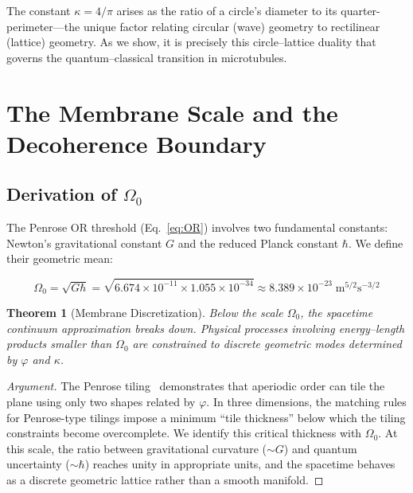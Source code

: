 \documentclass[12pt,a4paper]{article}
\theoremstyle{plain}
\newtheorem{theorem}{Theorem}[section]
\theoremstyle{definition}
\newcommand{\OmegaZero}{\Omega_0}
\newcommand{\golden}{\varphi}
\newcommand{\kap}{\kappa}
\begin{document}
The constant $\kap = 4/\pi$ arises as the ratio of a circle's diameter to its quarter-perimeter---the unique factor relating circular (wave) geometry to rectilinear (lattice) geometry. As we show, it is precisely this circle--lattice duality that governs the quantum--classical transition in microtubules.

\section{The Membrane Scale and the Decoherence Boundary}
\label{sec:membrane}

\subsection{Derivation of $\OmegaZero$}

The Penrose OR threshold (Eq.~\ref{eq:OR}) involves two fundamental constants: Newton's gravitational constant $G$ and the reduced Planck constant $\hbar$. We define their geometric mean:

\begin{equation}
\label{eq:omega0}
\boxed{\OmegaZero = \sqrt{G\hbar} = \sqrt{6.674 \times 10^{-11} \times 1.055 \times 10^{-34}} \approx 8.389 \times 10^{-23}\;\mathrm{m}^{5/2}\mathrm{s}^{-3/2}}
\end{equation}

\begin{theorem}[Membrane Discretization]
\label{thm:membrane}
Below the scale $\OmegaZero$, the spacetime continuum approximation breaks down. Physical processes involving energy--length products smaller than $\OmegaZero$ are constrained to discrete geometric modes determined by $\golden$ and $\kap$.
\end{theorem}

\begin{proof}[Argument]
The Penrose tiling~\cite{penrose1974} demonstrates that aperiodic order can tile the plane using only two shapes related by $\golden$. In three dimensions, the matching rules for Penrose-type tilings impose a minimum ``tile thickness'' below which the tiling constraints become overcomplete. We identify this critical thickness with $\OmegaZero$. At this scale, the ratio between gravitational curvature ($\sim G$) and quantum uncertainty ($\sim \hbar$) reaches unity in appropriate units, and the spacetime behaves as a discrete geometric lattice rather than a smooth manifold.
\end{proof}
\end{document}
